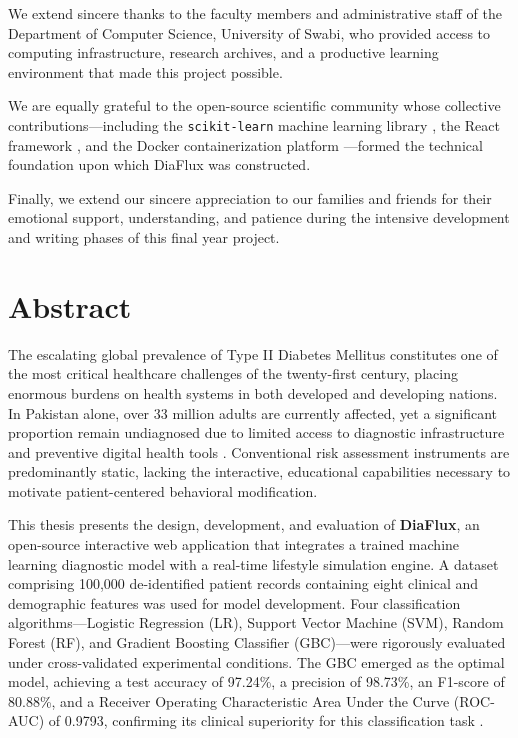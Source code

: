 \documentclass[12pt,a4paper]{report}
\begin{document}
We extend sincere thanks to the faculty members and administrative staff of the Department of Computer Science, University of Swabi, who provided access to computing infrastructure, research archives, and a productive learning environment that made this project possible.

We are equally grateful to the open-source scientific community whose collective contributions---including the \texttt{scikit-learn} machine learning library \cite{scikit_learn}, the React framework \cite{react_doc}, and the Docker containerization platform \cite{docker_doc}---formed the technical foundation upon which DiaFlux was constructed.

Finally, we extend our sincere appreciation to our families and friends for their emotional support, understanding, and patience during the intensive development and writing phases of this final year project.

\clearpage

\chapter*{Abstract}
The escalating global prevalence of Type II Diabetes Mellitus constitutes one of the most critical healthcare challenges of the twenty-first century, placing enormous burdens on health systems in both developed and developing nations. In Pakistan alone, over 33 million adults are currently affected, yet a significant proportion remain undiagnosed due to limited access to diagnostic infrastructure and preventive digital health tools \cite{idf_atlas_2021}. Conventional risk assessment instruments are predominantly static, lacking the interactive, educational capabilities necessary to motivate patient-centered behavioral modification.

This thesis presents the design, development, and evaluation of \textbf{DiaFlux}, an open-source interactive web application that integrates a trained machine learning diagnostic model with a real-time lifestyle simulation engine. A dataset comprising 100,000 de-identified patient records containing eight clinical and demographic features was used for model development. Four classification algorithms---Logistic Regression (LR), Support Vector Machine (SVM), Random Forest (RF), and Gradient Boosting Classifier (GBC)---were rigorously evaluated under cross-validated experimental conditions. The GBC emerged as the optimal model, achieving a test accuracy of 97.24\%, a precision of 98.73\%, an F1-score of 80.88\%, and a Receiver Operating Characteristic Area Under the Curve (ROC-AUC) of 0.9793, confirming its clinical superiority for this classification task \cite{friedman_gb}.
\end{document}
